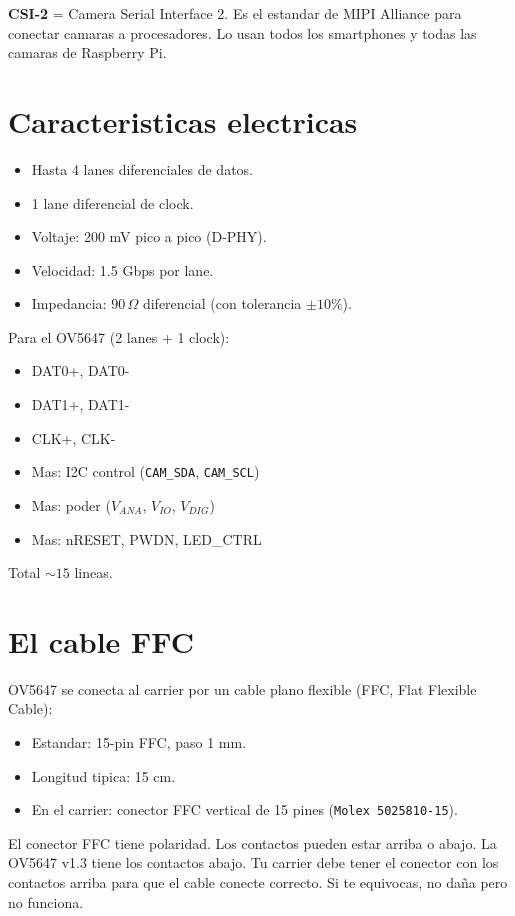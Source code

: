 \documentclass[11pt,a4paper,oneside,openright]{book}
\begin{document}
\textbf{CSI-2} = Camera Serial Interface 2. Es el estandar de MIPI
Alliance para conectar camaras a procesadores. Lo usan todos los
smartphones y todas las camaras de Raspberry Pi.

\section{Caracteristicas electricas}

\begin{itemize}[leftmargin=2em]
  \item Hasta 4 lanes diferenciales de datos.
  \item 1 lane diferencial de clock.
  \item Voltaje: 200 mV pico a pico (D-PHY).
  \item Velocidad: 1.5 Gbps por lane.
  \item Impedancia: $90\,\Omega$ diferencial (con tolerancia $\pm 10\%$).
\end{itemize}

Para el OV5647 (2 lanes + 1 clock):
\begin{itemize}[leftmargin=2em]
  \item DAT0+, DAT0-
  \item DAT1+, DAT1-
  \item CLK+, CLK-
  \item Mas: I2C control (\texttt{CAM\_SDA}, \texttt{CAM\_SCL})
  \item Mas: poder ($V_{ANA}$, $V_{IO}$, $V_{DIG}$)
  \item Mas: nRESET, PWDN, LED\_CTRL
\end{itemize}

Total $\sim 15$ lineas.

\section{El cable FFC}

OV5647 se conecta al carrier por un cable plano flexible (FFC, Flat
Flexible Cable):

\begin{itemize}[leftmargin=2em]
  \item Estandar: 15-pin FFC, paso 1 mm.
  \item Longitud tipica: 15 cm.
  \item En el carrier: conector FFC vertical de 15 pines (\texttt{Molex 5025810-15}).
\end{itemize}

\begin{cuidado}
El conector FFC tiene polaridad. Los contactos pueden estar arriba o
abajo. La OV5647 v1.3 tiene los contactos abajo. Tu carrier debe tener
el conector con los contactos arriba para que el cable conecte correcto.
Si te equivocas, no daña pero no funciona.
\end{cuidado}
\end{document}

